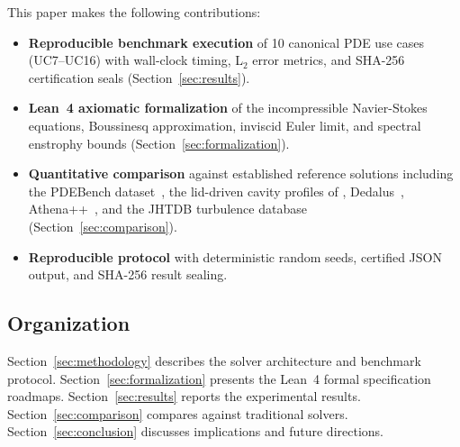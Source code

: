 This paper makes the following contributions:
\begin{itemize}
  \item \textbf{Reproducible benchmark execution} of 10 canonical PDE use cases 
        (UC7--UC16) with wall-clock timing, L$_2$ error metrics, and SHA-256 
        certification seals (Section~\ref{sec:results}).
  \item \textbf{Lean~4 axiomatic formalization} of the incompressible 
        Navier-Stokes equations, Boussinesq approximation, inviscid Euler 
        limit, and spectral enstrophy bounds (Section~\ref{sec:formalization}).
  \item \textbf{Quantitative comparison} against established reference solutions including the PDEBench dataset~\citep{takamoto2022pdebench}, the lid-driven cavity profiles of \citet{ghia1982high}, Dedalus~\citep{burns2020dedalus}, Athena++~\citep{stone2020athena}, and the JHTDB turbulence database~\citep{li2008public} (Section~\ref{sec:comparison}).
  \item \textbf{Reproducible protocol} with deterministic random seeds, 
        certified JSON output, and SHA-256 result sealing.
\end{itemize}

\subsection{Organization}

Section~\ref{sec:methodology} describes the solver architecture and benchmark 
protocol. Section~\ref{sec:formalization} presents the Lean~4 formal 
specification roadmaps. Section~\ref{sec:results} reports the experimental 
results. Section~\ref{sec:comparison} compares against traditional solvers. 
Section~\ref{sec:conclusion} discusses implications and future directions.
